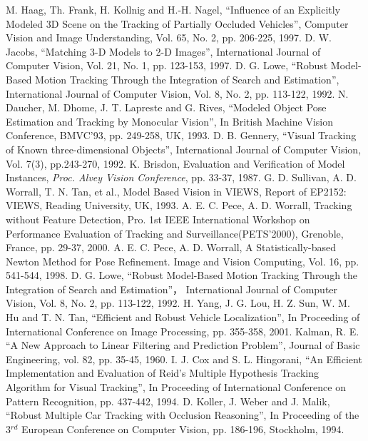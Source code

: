 \begin{thebibliography}{200}
 M. Haag, Th. Frank, H. Kollnig and H.-H. Nagel, ``Influence of an Explicitly Modeled 3D Scene on the Tracking of Partially Occluded Vehicles'', Computer Vision and Image Understanding, Vol. 65, No. 2, pp. 206-225, 1997.
 D. W. Jacobs, ``Matching 3-D Models to 2-D Images'', International Journal of Computer Vision, Vol. 21, No. 1, pp. 123-153, 1997.
 D. G. Lowe, ``Robust Model-Based Motion Tracking Through the Integration of Search and Estimation'', International Journal of Computer Vision, Vol. 8, No. 2, pp. 113-122, 1992.
 N. Daucher, M. Dhome, J. T. Lapreste and G. Rives, ``Modeled Object Pose Estimation and Tracking by Monocular Vision'', In British Machine Vision Conference, BMVC'93, pp. 249-258, UK, 1993.
 D. B. Gennery, ``Visual Tracking of Known three-dimensional Objects'', International Journal of Computer Vision, Vol. 7(3), pp.243-270, 1992.
 K. Brisdon, Evaluation and Verification of Model Instances, \textit{Proc. Alvey Vision Conference}, pp. 33-37, 1987.
 G. D. Sullivan, A. D. Worrall, T. N. Tan, et al., Model Based Vision in VIEWS, Report of EP2152: VIEWS, Reading University, UK, 1993.
 A. E. C. Pece, A. D. Worrall, Tracking without Feature Detection, Pro. 1st IEEE International Workshop on Performance Evaluation of Tracking and Surveillance(PETS'2000), Grenoble, France, pp. 29-37, 2000.
 A. E. C. Pece, A. D. Worrall, A Statistically-based Newton Method for Pose Refinement. Image and Vision Computing, Vol. 16, pp. 541-544, 1998.
 D. G. Lowe, ``Robust Model-Based Motion Tracking Through the Integration of Search and Estimation''， International Journal of Computer Vision, Vol. 8, No. 2, pp. 113-122, 1992.
 H. Yang, J. G. Lou, H. Z. Sun, W. M. Hu and T. N. Tan, ``Efficient and Robust Vehicle Localization'', In Proceeding of International Conference on Image Processing, pp. 355-358, 2001.
 Kalman, R. E. ``A New Approach to Linear Filtering and Prediction Problem'', Journal of Basic Engineering, vol. 82, pp. 35-45, 1960.
 I. J. Cox and S. L. Hingorani, ``An Efficient Implementation and Evaluation of Reid's Multiple Hypothesis Tracking Algorithm for Visual Tracking'', In Proceeding of International Conference on Pattern Recognition, pp. 437-442, 1994.
 D. Koller, J. Weber and J. Malik, ``Robust Multiple Car Tracking with Occlusion Reasoning'', In Proceeding of the 3$^{rd}$ European Conference on Computer Vision, pp. 186-196, Stockholm, 1994.

\end{thebibliography}
